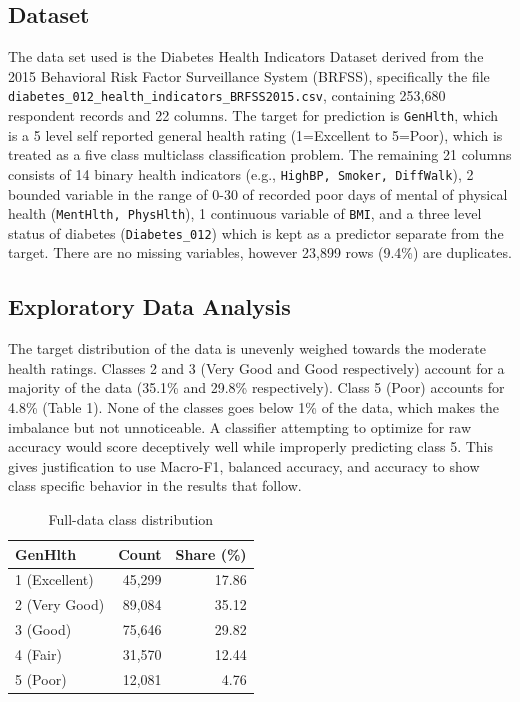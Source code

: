 \documentclass[conference]{IEEEtran}
\begin{document}
\subsection{Dataset}

The data set used is the Diabetes Health Indicators Dataset derived from the 2015 Behavioral Risk Factor Surveillance System (BRFSS), specifically the file \texttt{diabetes\_012\_health\_indicators\_BRFSS2015.csv}, containing 253,680 respondent records and 22 columns. The target for prediction is \texttt{GenHlth}, which is a 5 level self reported general health rating (1=Excellent to 5=Poor), which is treated as a five class multiclass classification problem. The remaining 21 columns consists of 14 binary health indicators (e.g., \texttt{HighBP, Smoker, DiffWalk}), 2 bounded variable in the range of 0-30 of recorded poor days of mental of physical health (\texttt{MentHlth, PhysHlth}), 1 continuous variable of \texttt{BMI}, and a three level status of diabetes (\texttt{Diabetes\_012}) which is kept as a predictor separate from the target. There are no missing variables, however 23,899 rows (9.4\%) are duplicates. 

\subsection{Exploratory Data Analysis}

The target distribution of the data is unevenly weighed towards the moderate health ratings. Classes 2 and 3 (Very Good and Good respectively) account for a majority of the data (35.1\% and 29.8\% respectively). Class 5 (Poor) accounts for 4.8\% (Table 1). None of the classes goes below 1\% of the data, which makes the imbalance but not unnoticeable. A classifier attempting to optimize for raw accuracy would score deceptively well while improperly predicting class 5. This gives justification to use Macro-F1, balanced accuracy, and accuracy to show class specific behavior in the results that follow. 

\begin{table}[htbp]
\caption{Full-data class distribution}
\label{tab:full-dist}
\centering
\begin{tabular}{lrr}
\toprule
\textbf{GenHlth} & \textbf{Count} & \textbf{Share (\%)} \\
\midrule
1 (Excellent) & 45{,}299 & 17.86 \\
2 (Very Good) & 89{,}084 & 35.12 \\
3 (Good)      & 75{,}646 & 29.82 \\
4 (Fair)      & 31{,}570 & 12.44 \\
5 (Poor)      & 12{,}081 &  4.76 \\
\bottomrule
\end{tabular}
\end{table}
\end{document}
